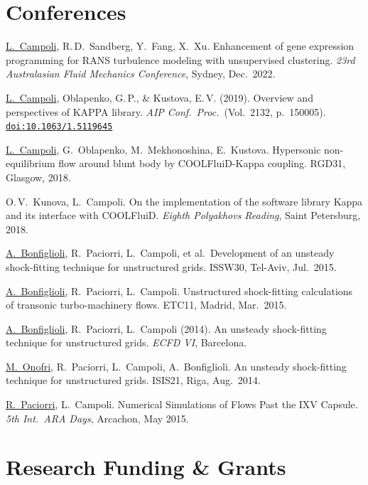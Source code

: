 \documentclass[11pt,a4paper]{article}
\begin{document}
\section{Conferences}

\underline{L.\ Campoli}, R.\,D.\ Sandberg, Y.\ Fang, X.\ Xu. Enhancement of gene expression
programming for RANS turbulence modeling with unsupervised clustering.
\textit{23rd Australasian Fluid Mechanics Conference}, Sydney, Dec.\ 2022.

\smallskip
\underline{L.\ Campoli}, Oblapenko, G.\,P., \& Kustova, E.\,V. (2019). Overview and
perspectives of KAPPA library. \textit{AIP Conf.\ Proc.}\ (Vol.\ 2132, p.\ 150005).
\href{https://doi.org/10.1063/1.5119645}{\texttt{doi:10.1063/1.5119645}}

\smallskip
\underline{L.\ Campoli}, G.\ Oblapenko, M.\ Mekhonoshina, E.\ Kustova. Hypersonic
non-equilibrium flow around blunt body by COOLFluiD-Kappa coupling. RGD31, Glasgow, 2018.

\smallskip
O.\,V.\ Kunova, L.\ Campoli. On the implementation of the software library Kappa and its
interface with COOLFluiD. \textit{Eighth Polyakhovs Reading}, Saint Petersburg, 2018.

\smallskip
\underline{A.\ Bonfiglioli}, R.\ Paciorri, L.\ Campoli, et al.\ Development of an unsteady
shock-fitting technique for unstructured grids. ISSW30, Tel-Aviv, Jul.\ 2015.

\smallskip
\underline{A.\ Bonfiglioli}, R.\ Paciorri, L.\ Campoli. Unstructured shock-fitting
calculations of transonic turbo-machinery flows. ETC11, Madrid, Mar.\ 2015.

\smallskip
\underline{A.\ Bonfiglioli}, R.\ Paciorri, L.\ Campoli (2014). An unsteady shock-fitting
technique for unstructured grids. \textit{ECFD VI}, Barcelona.

\smallskip
\underline{M.\ Onofri}, R.\ Paciorri, L.\ Campoli, A.\ Bonfiglioli. An unsteady
shock-fitting technique for unstructured grids. ISIS21, Riga, Aug.\ 2014.

\smallskip
\underline{R.\ Paciorri}, L.\ Campoli. Numerical Simulations of Flows Past the IXV
Capsule. \textit{5th Int.\ ARA Days}, Arcachon, May 2015.

\newpage

\section{Research Funding \& Grants}
\end{document}
